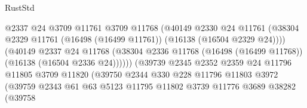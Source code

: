 \begin{lexlean}{RustStd}
\begin{coremodule}
                                          @2337
                                          @24
                                          @3709
                                          @11761
                                          @3709
                                          @11768
                                          (@40149
                                            @2330
                                            @24
                                            @11761
                                            (@38304
                                              @2329
                                              @11761
                                              (@16498 (@16499 @11761))
                                              (@16138 (@16504 @2329 @24))))
                                          (@40149
                                            @2337
                                            @24
                                            @11768
                                            (@38304
                                              @2336
                                              @11768
                                              (@16498 (@16499 @11768))
                                              (@16138 (@16504 @2336 @24))))))
                                      (@39739
                                        @2345
                                        @2352
                                        @2359
                                        @24
                                        @11796
                                        @11805
                                        @3709
                                        @11820
                                        (@39750
                                          @2344
                                          @330
                                          @228
                                          @11796
                                          @11803
                                          @3972
                                          (@39759
                                            @2343
                                            @61
                                            @63
                                            @5123
                                            @11795
                                            @11802
                                            @3739
                                            @11776
                                            @3689
                                            @38282
                                            (@39758

\end{coremodule}
\end{lexlean}
